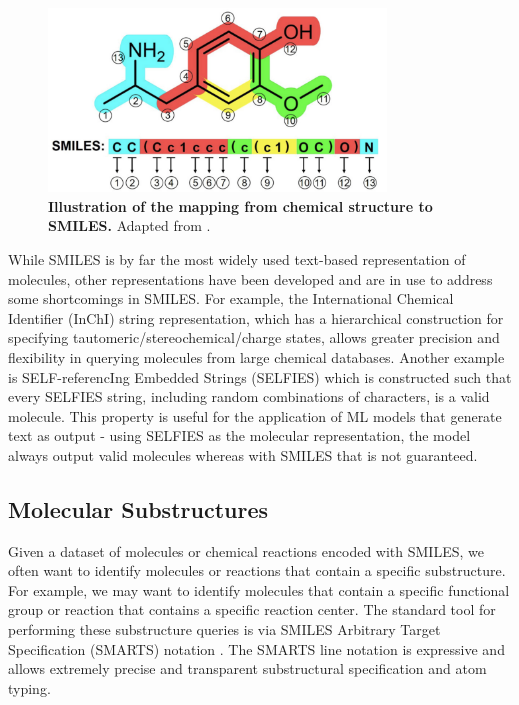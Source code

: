 \begin{figure}[!h]
    \centering
    \includegraphics[width=0.8\textwidth]{Chapters/Background/Figs/smiles.png}
    \caption{\label{fig:smiles} \textbf{Illustration of the mapping from chemical structure to SMILES.} Adapted from \cite{Kim2021GenerativeCT}.}
\end{figure}

While SMILES is by far the most widely used text-based representation of molecules, other representations have been developed and are in use to address some shortcomings in SMILES. For example, the International Chemical Identifier (InChI) \cite{Heller2013InChI} string representation, which has a hierarchical construction for specifying tautomeric/stereochemical/charge states, allows greater precision and flexibility in querying molecules from large chemical databases. Another example is SELF-referencIng Embedded Strings (SELFIES) \cite{Krenn2020Selfies} which is constructed such that every SELFIES string, including random combinations of characters, is a valid molecule. This property is useful for the application of ML models that generate text as output - using SELFIES as the molecular representation, the model always output valid molecules whereas with SMILES that is not guaranteed.

\subsection{Molecular Substructures} \label{subsec:smarts}
Given a dataset of molecules or chemical reactions encoded with SMILES, we often want to identify molecules or reactions that contain a specific substructure. For example, we may want to identify molecules that contain a specific functional group or reaction that contains a specific reaction center. The standard tool for performing these substructure queries is via SMILES Arbitrary Target Specification (SMARTS) notation \cite{SMARTS}. The SMARTS line notation is expressive and allows extremely precise and transparent substructural specification and atom typing.

